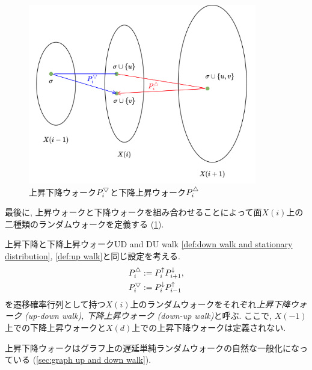 \begin{figure}
    \begin{center}
    \includegraphics[width=10cm]{images/walks.png}
    \caption{上昇下降ウォーク$P^{\bigtriangledown}_i$と下降上昇ウォーク$P^{\triangle}_i$ \label{fig:walks}}
    \end{center}
\end{figure}
最後に, 上昇ウォークと下降ウォークを組み合わせることによって面$X(i)$上の二種類のランダムウォークを定義する (\cref{fig:walks}).
\begin{definition}{上昇下降と下降上昇ウォーク}{UD and DU walk}
    \cref{def:down walk and stationary distribution}, \ref{def:up walk}と同じ設定を考える.
    \begin{align*}
        &P^{\triangle}_i \mathrel{:=}  P^{\uparrow}_i P^{\downarrow}_{i+1},\\
        &P^{\bigtriangledown}_i \mathrel{:=} P^{\downarrow}_{i}P^{\uparrow}_{i-1}
    \end{align*}
    を遷移確率行列として持つ$X(i)$上のランダムウォークをそれぞれ\emph{上昇下降ウォーク (up-down walk), 下降上昇ウォーク (down-up walk)}と呼ぶ.
    ここで, $X(-1)$上での下降上昇ウォークと$X(d)$上での上昇下降ウォークは定義されない.
\end{definition}
上昇下降ウォークはグラフ上の遅延単純ランダムウォークの自然な一般化になっている (\cref{sec:graph up and down walk}).

